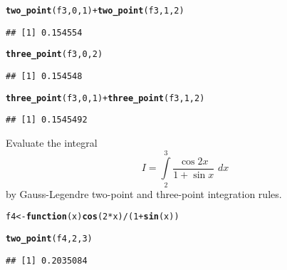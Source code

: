 \documentclass[11pt, a4paper]{article}\usepackage[]{graphicx}\usepackage[]{xcolor}
\makeatletter
\newcommand{\hlnum}[1]{\textcolor[rgb]{0.686,0.059,0.569}{#1}}%
\newcommand{\hlopt}[1]{\textcolor[rgb]{0,0,0}{#1}}%
\newcommand{\hldef}[1]{\textcolor[rgb]{0.345,0.345,0.345}{#1}}%
\newcommand{\hlkwa}[1]{\textcolor[rgb]{0.161,0.373,0.58}{\textbf{#1}}}%
\newcommand{\hlkwb}[1]{\textcolor[rgb]{0.69,0.353,0.396}{#1}}%
\newcommand{\hlkwc}[1]{\textcolor[rgb]{0.333,0.667,0.333}{#1}}%
\newcommand{\hlkwd}[1]{\textcolor[rgb]{0.737,0.353,0.396}{\textbf{#1}}}%
\newenvironment{kframe}{%
 \def\at@end@of@kframe{}%
 \ifinner\ifhmode%
  \def\at@end@of@kframe{\end{minipage}}%
  \begin{minipage}{\columnwidth}%
 \fi\fi%
 \def\FrameCommand##1{\hskip\@totalleftmargin \hskip-\fboxsep
 \colorbox{shadecolor}{##1}\hskip-\fboxsep
     \hskip-\linewidth \hskip-\@totalleftmargin \hskip\columnwidth}%
 \MakeFramed {\advance\hsize-\width
   \@totalleftmargin\z@ \linewidth\hsize
   \@setminipage}}%
 {\par\unskip\endMakeFramed%
 \at@end@of@kframe}
\newenvironment{knitrout}{}{} %
\makeatother
\begin{document}
\begin{knitrout}
\color{fgcolor}\begin{kframe}
\begin{alltt}
\hlkwd{two_point}\hldef{(f3,} \hlnum{0}\hldef{,} \hlnum{1}\hldef{)} \hlopt{+} \hlkwd{two_point}\hldef{(f3,} \hlnum{1}\hldef{,} \hlnum{2}\hldef{)}
\end{alltt}
\begin{verbatim}
## [1] 0.154554
\end{verbatim}
\end{kframe}
\end{knitrout}

\begin{knitrout}
\color{fgcolor}\begin{kframe}
\begin{alltt}
\hlkwd{three_point}\hldef{(f3,} \hlnum{0}\hldef{,} \hlnum{2}\hldef{)}
\end{alltt}
\begin{verbatim}
## [1] 0.154548
\end{verbatim}
\end{kframe}
\end{knitrout}

\begin{knitrout}
\color{fgcolor}\begin{kframe}
\begin{alltt}
\hlkwd{three_point}\hldef{(f3,} \hlnum{0}\hldef{,} \hlnum{1}\hldef{)} \hlopt{+} \hlkwd{three_point}\hldef{(f3,} \hlnum{1}\hldef{,} \hlnum{2}\hldef{)}
\end{alltt}
\begin{verbatim}
## [1] 0.1545492
\end{verbatim}
\end{kframe}
\end{knitrout}

\leftpointright \hspace{0.5cm} Evaluate the integral $$I = \int \limits_{2}^{3} \dfrac{\cos 2x}{1 + \sin x} \,\, dx$$ by Gauss-Legendre two-point and three-point integration rules.

\begin{knitrout}
\color{fgcolor}\begin{kframe}
\begin{alltt}
\hldef{f4} \hlkwb{<-} \hlkwa{function}\hldef{(}\hlkwc{x}\hldef{)} \hlkwd{cos}\hldef{(}\hlnum{2}\hlopt{*}\hldef{x)} \hlopt{/} \hldef{(}\hlnum{1} \hlopt{+} \hlkwd{sin}\hldef{(x))}

\hlkwd{two_point}\hldef{(f4,} \hlnum{2}\hldef{,} \hlnum{3}\hldef{)}
\end{alltt}
\begin{verbatim}
## [1] 0.2035084
\end{verbatim}
\end{kframe}
\end{knitrout}
\end{document}
